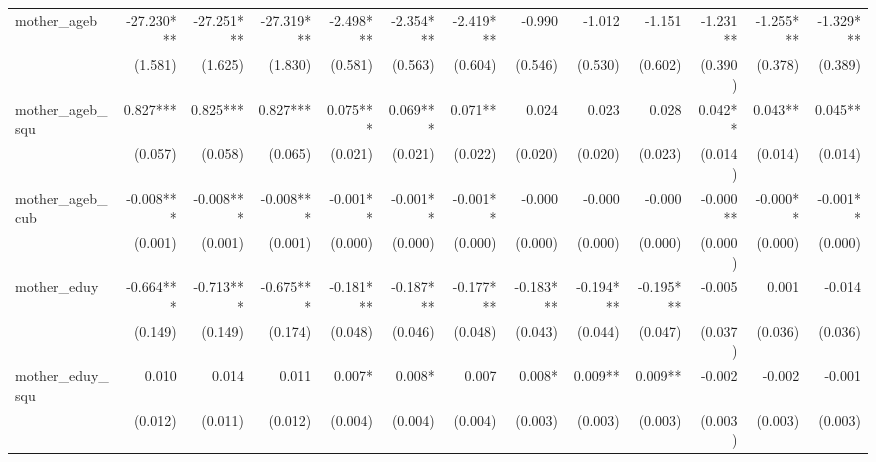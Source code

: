 \begin{tabular}{lrrrrrrrrrrrr}
mother\_ageb                                &   -27.230*** &   -27.251*** &   -27.319*** &    -2.498*** &    -2.354*** &    -2.419*** &       -0.990 &       -1.012 &       -1.151 &     -1.231** &    -1.255*** &    -1.329*** \\ 
                                            &      (1.581) &      (1.625) &      (1.830) &      (0.581) &      (0.563) &      (0.604) &      (0.546) &      (0.530) &      (0.602) &      (0.390) &      (0.378) &      (0.389) \\ 
mother\_ageb\_squ                           &     0.827*** &     0.825*** &     0.827*** &     0.075*** &     0.069*** &      0.071** &        0.024 &        0.023 &        0.028 &      0.042** &      0.043** &      0.045** \\ 
                                            &      (0.057) &      (0.058) &      (0.065) &      (0.021) &      (0.021) &      (0.022) &      (0.020) &      (0.020) &      (0.023) &      (0.014) &      (0.014) &      (0.014) \\ 
mother\_ageb\_cub                           &    -0.008*** &    -0.008*** &    -0.008*** &     -0.001** &     -0.001** &     -0.001** &       -0.000 &       -0.000 &       -0.000 &     -0.000** &     -0.000** &     -0.001** \\ 
                                            &      (0.001) &      (0.001) &      (0.001) &      (0.000) &      (0.000) &      (0.000) &      (0.000) &      (0.000) &      (0.000) &      (0.000) &      (0.000) &      (0.000) \\ 
mother\_eduy                                &    -0.664*** &    -0.713*** &    -0.675*** &    -0.181*** &    -0.187*** &    -0.177*** &    -0.183*** &    -0.194*** &    -0.195*** &       -0.005 &        0.001 &       -0.014 \\ 
                                            &      (0.149) &      (0.149) &      (0.174) &      (0.048) &      (0.046) &      (0.048) &      (0.043) &      (0.044) &      (0.047) &      (0.037) &      (0.036) &      (0.036) \\ 
mother\_eduy\_squ                           &        0.010 &        0.014 &        0.011 &       0.007* &       0.008* &        0.007 &       0.008* &      0.009** &      0.009** &       -0.002 &       -0.002 &       -0.001 \\ 
                                            &      (0.012) &      (0.011) &      (0.012) &      (0.004) &      (0.004) &      (0.004) &      (0.003) &      (0.003) &      (0.003) &      (0.003) &      (0.003) &      (0.003) \\ 

\end{tabular}
